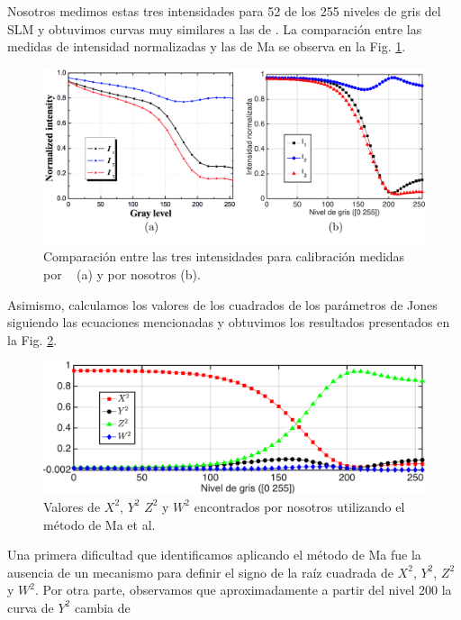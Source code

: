 Nosotros medimos estas tres intensidades para 52 de los 255 niveles de
gris del SLM y obtuvimos curvas muy similares a las de . La
comparación entre las medidas de intensidad normalizadas y las de Ma se observa en la
Fig. \ref{fig:Ma_and_our_Is}.
\begin{figure}[h!]
\includegraphics[scale = .27]{Ma_and_our_Is.pdf}
\caption[Comparación entre las tres intensidades para calibración
medidas por Ma et al.~ para un SLM similar y por
nosotros.]{Comparación entre las tres intensidades para calibración 
medidas por ~ (a) y por nosotros (b).}
\label{fig:Ma_and_our_Is}
\end{figure}
Asimismo, calculamos los valores de los cuadrados de los parámetros de
Jones siguiendo las ecuaciones mencionadas y obtuvimos los resultados
presentados en la Fig. \ref{fig:Our_Ma_X2Y2Z2W2}. 
\begin{figure}[h!]
\includegraphics[scale = .55]{Our_Ma_X2Y2Z2W2_long.pdf}
\caption[Valores de $X^2$, $Y^2$ $Z^2$ y $W^2$ encontrados por
nosotros utilizando el método de Ma et al.]{Valores de $X^2$, $Y^2$ $Z^2$ y $W^2$ encontrados por
nosotros utilizando el método de Ma et al.}   
\label{fig:Our_Ma_X2Y2Z2W2}
\end{figure}
Una primera dificultad que identificamos aplicando el método de Ma fue
la ausencia de un mecanismo para definir el signo de la raíz
cuadrada de $X^2$, $Y^2$, $Z^2$ y $W^2$. Por otra parte, observamos
que aproximadamente a partir del nivel 200 la curva de $Y^2$ cambia de
